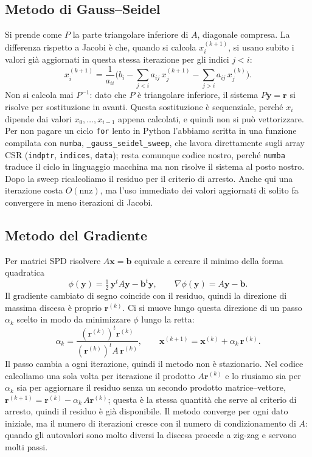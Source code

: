 \documentclass[11pt,a4paper]{article}
\begin{document}
\subsection{Metodo di Gauss--Seidel}
Si prende come $P$ la parte triangolare inferiore di $A$, diagonale compresa. La
differenza rispetto a Jacobi è che, quando si calcola $x_i^{(k+1)}$, si usano
subito i valori già aggiornati in questa stessa iterazione per gli indici $j<i$:
\[
x_i^{(k+1)}=\frac{1}{a_{ii}}\Big(b_i-\sum_{j<i} a_{ij}\,x_j^{(k+1)}
-\sum_{j>i} a_{ij}\,x_j^{(k)}\Big).
\]
Non si calcola mai $P^{-1}$: dato che $P$ è triangolare inferiore, il sistema
$P\mathbf{y}=\mathbf{r}$ si risolve per sostituzione in avanti. Questa
sostituzione è sequenziale, perché $x_i$ dipende dai valori
$x_0,\dots,x_{i-1}$ appena calcolati, e quindi non si può vettorizzare. Per non
pagare un ciclo \texttt{for} lento in Python l'abbiamo scritta in una funzione
compilata con \texttt{numba}, \texttt{\_gauss\_seidel\_sweep}, che lavora
direttamente sugli array CSR (\texttt{indptr}, \texttt{indices}, \texttt{data});
resta comunque codice nostro, perché \texttt{numba} traduce il ciclo in
linguaggio macchina ma non risolve il sistema al posto nostro. Dopo la sweep
ricalcoliamo il residuo per il criterio di arresto. Anche qui una iterazione
costa $O(\text{nnz})$, ma l'uso immediato dei valori aggiornati di solito fa
convergere in meno iterazioni di Jacobi.

\subsection{Metodo del Gradiente}
Per matrici SPD risolvere $A\mathbf{x}=\mathbf{b}$ equivale a cercare il minimo
della forma quadratica
\[
\phi(\mathbf{y})=\tfrac12\,\mathbf{y}^{t}A\mathbf{y}-\mathbf{b}^{t}\mathbf{y},
\qquad \nabla\phi(\mathbf{y})=A\mathbf{y}-\mathbf{b}.
\]
Il gradiente cambiato di segno coincide con il residuo, quindi la direzione di
massima discesa è proprio $\mathbf{r}^{(k)}$. Ci si muove lungo questa direzione
di un passo $\alpha_k$ scelto in modo da minimizzare $\phi$ lungo la retta:
\[
\alpha_k=\frac{(\mathbf{r}^{(k)})^{t}\mathbf{r}^{(k)}}
{(\mathbf{r}^{(k)})^{t}A\,\mathbf{r}^{(k)}},
\qquad
\mathbf{x}^{(k+1)}=\mathbf{x}^{(k)}+\alpha_k\,\mathbf{r}^{(k)}.
\]
Il passo cambia a ogni iterazione, quindi il metodo non è stazionario. Nel
codice calcoliamo una sola volta per iterazione il prodotto $A\mathbf{r}^{(k)}$ e
lo riusiamo sia per $\alpha_k$ sia per aggiornare il residuo senza un secondo
prodotto matrice--vettore, $\mathbf{r}^{(k+1)}=\mathbf{r}^{(k)}-\alpha_k\,
A\mathbf{r}^{(k)}$; questa è la stessa quantità che serve al criterio di arresto,
quindi il residuo è già disponibile. Il metodo converge per ogni dato iniziale,
ma il numero di iterazioni cresce con il numero di condizionamento di $A$:
quando gli autovalori sono molto diversi la discesa procede a zig-zag e servono
molti passi.
\end{document}
